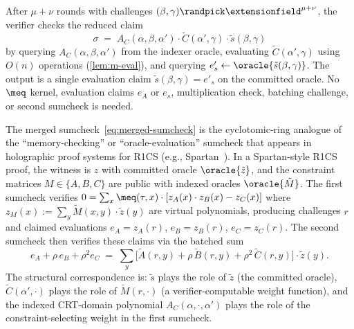 After $\mu + \nu$ rounds with challenges $(\beta, \gamma) \randpick \extensionfield^{\mu + \nu}$, the verifier checks the reduced claim
\[
    \sigma \;=\; A_C(\alpha, \beta, \alpha') \cdot \tilde{C}(\alpha', \gamma) \cdot \tilde{s}(\beta, \gamma)
\]
by querying $A_C(\alpha, \beta, \alpha')$ from the indexer oracle, evaluating $\tilde{C}(\alpha', \gamma)$ using $O(n)$ operations (\cref{lem:m-eval}), and querying $e'_s \gets \oracle{\tilde{s}(\beta, \gamma)}$. The output is a single evaluation claim $\tilde{s}(\beta, \gamma) = e'_s$ on the committed oracle. No $\meq$ kernel, evaluation claims $e_A$ or $e_s$, multiplication check, batching challenge, or second sumcheck is needed.

\begin{remark}\label{rem:r1cs-analogy}
    The merged sumcheck~\eqref{eq:merged-sumcheck} is the cyclotomic-ring analogue of the ``memory-checking'' or ``oracle-evaluation'' sumcheck that appears in holographic proof systems for R1CS (e.g., Spartan~\cite{spartan}). In a Spartan-style R1CS proof, the witness is $z$ with committed oracle $\oracle{\tilde{z}}$, and the constraint matrices $M \in \{A, B, C\}$ are public with indexed oracles $\oracle{\tilde{M}}$. The first sumcheck verifies $0 = \sum_x \meq(\tau, x) \cdot [z_A(x) \cdot z_B(x) - z_C(x)]$ where $z_M(x) := \sum_y \tilde{M}(x, y) \cdot \tilde{z}(y)$ are virtual polynomials, producing challenges $r$ and claimed evaluations $e_A = z_A(r)$, $e_B = z_B(r)$, $e_C = z_C(r)$. The second sumcheck then verifies these claims via the batched sum
    \[
        e_A + \rho \, e_B + \rho^2 e_C \;=\; \sum_{y} \bigl[\tilde{A}(r, y) + \rho\, \tilde{B}(r, y) + \rho^2\, \tilde{C}(r, y)\bigr] \cdot \tilde{z}(y).
    \]
    The structural correspondence is: $\tilde{s}$ plays the role of $\tilde{z}$ (the committed oracle), $\tilde{C}(\alpha', \cdot)$ plays the role of $\tilde{M}(r, \cdot)$ (a verifier-computable weight function), and the indexed CRT-domain polynomial $A_C(\alpha, \cdot, \alpha')$ plays the role of the constraint-selecting weight in the first sumcheck.
\end{remark}



